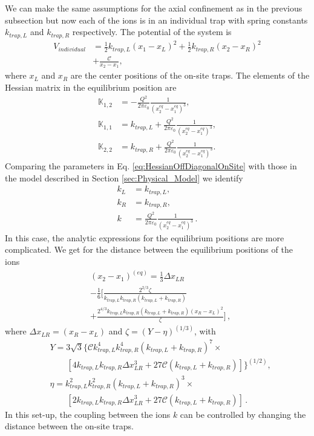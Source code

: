We can make the same assumptions for the axial confinement as in the previous subsection but now each of the ions is in an individual trap with spring constants $k_{trap,L}$ and $k_{trap,R}$ respectively. The potential of the system is
%
\begin{align}
    V_{individual} &= \frac{1}{2}k_{trap,L}\left(x_1 -x_L\right)^2 +\frac{1}{2}k_{trap, R}\left(x_2 -x_R\right)^2 \nonumber \\&+ \frac{\mathcal{C}}{x_2-x_1},
\end{align}
%
where $x_L$ and $x_R$ are the center positions of the on-site traps. The elements of the Hessian matrix in the equilibrium position are
%
\begin{align}
  \mathbb{K}_{1,2} &= -\frac{Q^2}{2\pi\varepsilon_0}\frac{1}{(x_2^{eq}-x_1^{eq})^3},\nonumber
  \\
  \mathbb{K}_{1,1} &= k_{trap,L} + \frac{Q^2}{2\pi\varepsilon_0}\frac{1}{(x_2^{eq}-x_1^{eq})^3},\nonumber
  \\
  \mathbb{K}_{2,2} &= k_{trap,R} + \frac{Q^2}{2\pi\varepsilon_0}\frac{1}{(x_2^{eq}-x_1^{eq})^3}.
  \label{eq:HessianOffDiagonalOnSite}
\end{align}
%
Comparing the parameters in Eq. \eqref{eq:HessianOffDiagonalOnSite} with those in the model described in Section \ref{sec:Physical_Model} we identify
\begin{align}
  k_L &= k_{trap,L},\nonumber\\
  k_R &= k_{trap,R},\nonumber\\
  k &= \frac{Q^2}{2\pi\varepsilon_0}\frac{1}{(x_2^{eq}-x_1^{eq})^3}\,.
\end{align}
%
In this case, the analytic expressions for the equilibrium positions are more complicated. We get for the distance between the equilibrium positions of the ions
%
\begin{align}
  &(x_2 - x_1)^{(eq)} = \frac{1}{3} \Delta x_{LR}\nonumber\\
  &- \frac{1}{6}\Big[ \frac{2^{2/3}\zeta}{k_{trap,L} k_{trap,R} (k_{trap,L} + k_{trap,R})}\nonumber\\
  &+ \frac{2^{4/3} k_{trap,L} k_{trap,R} (k_{trap,L} + k_{trap,R}) (x_R-x_L)^2}{\zeta} \Big]\,,
\end{align}
%
where $\Delta x_{LR} = (x_R-x_L)$ and $\zeta = \left( Y - \eta \right)^{(1/3)}$, with
%
\begin{align}
  &Y = 3 \sqrt{3} \bigg\{\mathcal{C} k_{trap,L}^4 k_{trap,R}^4 \left(k_{trap,L}+k_{trap,R}\right)^{7}\times\nonumber\\& \quad\quad \left[4 k_{trap,L} k_{trap,R} \Delta x_{LR}^3+27 \mathcal{C} \left(k_{trap,L}+k_{trap,R}\right)\right]\bigg\}^{(1/2)},\nonumber
  \\
  &\eta =  k_{trap,L}^2 k_{trap,R}^2 \left(k_{trap,L}+k_{trap,R}\right)^{3}\times\nonumber\\ &\quad\quad\left[2 k_{trap,L} k_{trap,R} \Delta x_{LR}^3+27 \mathcal{C} \left(k_{trap,L}+k_{trap,R}\right)\right]\,.
\end{align}
%
In this set-up, the coupling between the ions $k$ can be controlled by changing the distance between the on-site traps.



